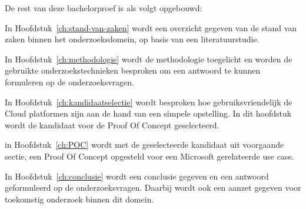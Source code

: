De rest van deze bachelorproef is als volgt opgebouwd:

In Hoofdstuk~\ref{ch:stand-van-zaken} wordt een overzicht gegeven van de stand van zaken binnen het onderzoeksdomein, op basis van een literatuurstudie.

In Hoofdstuk~\ref{ch:methodologie} wordt de methodologie toegelicht en worden de gebruikte onderzoekstechnieken besproken om een antwoord te kunnen formuleren op de onderzoeksvragen.

In Hoofdstuk~\ref{ch:kandidaatselectie} wordt besproken hoe gebruiksvriendelijk de Cloud platformen zijn aan de hand van een simpele opstelling. In dit hoofdstuk wordt de kandidaat voor de Proof Of Concept geselecteerd.

in Hoofdstuk~\ref{ch:POC} wordt met de geselecteerde kandidaat uit voorgaande sectie, een Proof Of Concept opgesteld voor een Microsoft gerelateerde use case.

In Hoofdstuk~\ref{ch:conclusie} wordt een conclusie gegeven en een antwoord geformuleerd op de onderzoeksvragen. Daarbij wordt ook een aanzet gegeven voor toekomstig onderzoek binnen dit domein.

